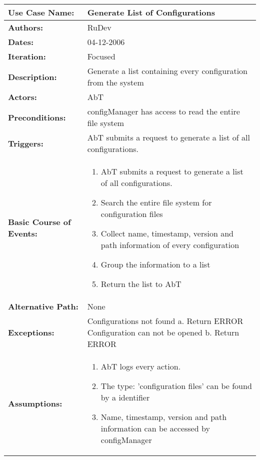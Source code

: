 \begin{tabularx}{\linewidth}{|l|X|}
\hline
\textbf{Use Case Name:} & \textbf{Generate List of Configurations} \\
\hline
\textbf{Authors:} & RuDev \\
\hline
\textbf{Dates:} & 04-12-2006 \\
\hline
\textbf{Iteration:} & Focused \\
\hline
\textbf{Description:} & Generate a list containing every configuration from the system \\
\hline
\textbf{Actors:} & AbT \\
\hline
\textbf{Preconditions:} & configManager has access to read the entire file system \\
\hline
\textbf{Triggers:} & AbT submits a request to generate a list of all configurations. \\
\hline
\textbf{Basic Course of Events:} & 
\begin{minipage}{\linewidth} 
  \vspace{0.05em}
  \begin{enumerate}
   \item AbT submits a request to generate a list of all configurations.
   \item Search the entire file system for configuration files
   \item Collect name, timestamp, version and path information of every configuration
   \item Group the information to a list
   \item Return the list to AbT
  \end{enumerate}
  \vspace{0.05em}
\end{minipage}
\\
\hline 
\textbf{Alternative Path:} & None \\
\hline
\textbf{Exceptions:} & Configurations not found \newline a. Return ERROR \newline \newline Configuration can not be opened \newline b. Return ERROR \\
\hline
\textbf{Assumptions:} & \begin{enumerate} 
							\item AbT logs every action.
							\item The type: 'configuration files' can be found by a identifier
							\item Name, timestamp, version and path information can be accessed by configManager

\end{enumerate}
\end{tabularx}
